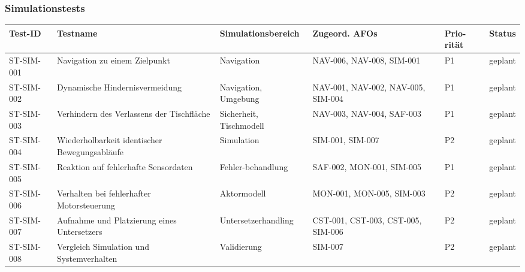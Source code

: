 \subsubsection{Simulationstests}\label{simulationstests-2}

\begin{longtable}[]{@{}
  >{\raggedright\arraybackslash}p{}
  >{\raggedright\arraybackslash}p{}
  >{\raggedleft\arraybackslash}p{}
  >{\raggedright\arraybackslash}p{}
  >{\raggedright\arraybackslash}p{}
  >{\raggedright\arraybackslash}p{}@{}}
\toprule\noalign{}
\begin{minipage}[b]{\linewidth}\raggedright
Test-ID
\end{minipage} & \begin{minipage}[b]{\linewidth}\raggedright
Testname
\end{minipage} & \begin{minipage}[b]{\linewidth}\raggedleft
Simulationsbereich
\end{minipage} & \begin{minipage}[b]{\linewidth}\raggedright
Zugeord. AFOs
\end{minipage} & \begin{minipage}[b]{\linewidth}\raggedright
Prio-rität
\end{minipage} & \begin{minipage}[b]{\linewidth}\raggedright
Status
\end{minipage} \\
\midrule\noalign{}
\endhead
\bottomrule\noalign{}
\endlastfoot
ST-SIM-001 & Navigation zu einem Zielpunkt & Navigation & NAV-006,
NAV-008, SIM-001 & P1 & geplant \\
ST-SIM-002 & Dynamische Hindernisvermeidung & Navigation, Umgebung &
NAV-001, NAV-002, NAV-005, SIM-004 & P1 & geplant \\
ST-SIM-003 & Verhindern des Verlassens der Tischfläche & Sicherheit,
Tischmodell & NAV-003, NAV-004, SAF-003 & P1 & geplant \\
ST-SIM-004 & Wiederholbarkeit identischer Bewegungsabläufe & Simulation
& SIM-001, SIM-007 & P2 & geplant \\
ST-SIM-005 & Reaktion auf fehlerhafte Sensordaten & Fehler-behandlung &
SAF-002, MON-001, SIM-005 & P1 & geplant \\
ST-SIM-006 & Verhalten bei fehlerhafter Motorsteuerung & Aktormodell &
MON-001, MON-005, SIM-003 & P2 & geplant \\
ST-SIM-007 & Aufnahme und Platzierung eines Untersetzers &
Untersetzerhandling & CST-001, CST-003, CST-005, SIM-006 & P2 &
geplant \\
ST-SIM-008 & Vergleich Simulation und Systemverhalten & Validierung &
SIM-007 & P2 & geplant \\
\end{longtable}

